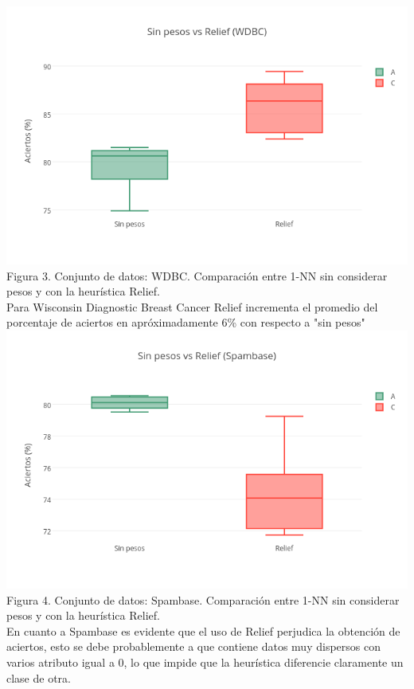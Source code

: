 \documentclass{ci5652}
\begin{document}
\includegraphics[width=\columnwidth]{no_weights-Relief_WDBC}
Figura 3. Conjunto de datos: WDBC. Comparación entre 1-NN sin considerar pesos y con la heurística Relief.\\

Para Wisconsin Diagnostic Breast Cancer Relief incrementa el promedio del porcentaje de aciertos en apróximadamente 6\% con respecto a "sin pesos"\\

\includegraphics[width=\columnwidth]{no_weights-Relief_Spambase}
Figura 4. Conjunto de datos: Spambase. Comparación entre 1-NN sin considerar pesos y con la heurística Relief.\\

En cuanto a Spambase es evidente que el uso de Relief perjudica la obtención de aciertos, esto se debe probablemente a que contiene datos muy dispersos con varios atributo igual a 0, lo que impide que la heurística diferencie claramente un clase de otra.\\
\end{document}
